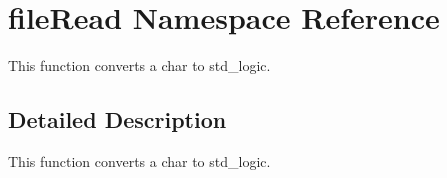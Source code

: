 \hypertarget{namespacefile_read}{\section{file\-Read Namespace Reference}
\label{namespacefile_read}
}


This function converts a char to std\-\_\-logic.  




\subsection{Detailed Description}
This function converts a char to std\-\_\-logic. 
